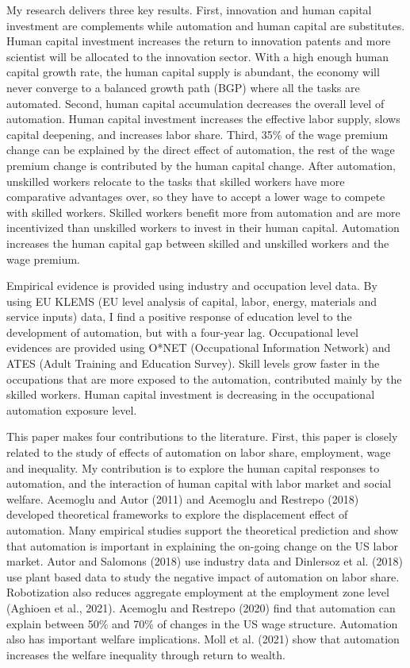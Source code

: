 \documentclass[12pt]{article}
\begin{document}
My research delivers three key results. First, innovation and human capital investment are complements while automation and human capital are substitutes. Human capital investment increases the return to innovation patents and more scientist will be allocated to the innovation sector. With a high enough human capital growth rate, the human capital supply is abundant, the economy will never converge to a balanced growth path (BGP) where all the tasks are automated. Second, human capital accumulation decreases the overall level of automation. Human capital investment increases the effective labor supply, slows capital deepening, and increases labor share. Third, 35\% of the wage premium change can be explained by the direct effect of automation, the rest of the wage premium change is contributed by the human capital change. After automation, unskilled workers relocate to the tasks that skilled workers have more comparative advantages over, so they have to accept a lower wage to compete with skilled workers. Skilled workers benefit more from automation and are more incentivized than unskilled workers to invest in their human capital. Automation increases the human capital gap between skilled and unskilled workers and the wage premium. 

Empirical evidence is provided using  industry and occupation level data. By using EU KLEMS (EU level analysis of capital, labor, energy, materials and service inputs) data, I find a positive response of education level to the development of automation, but with a four-year lag. Occupational level evidences are provided using O*NET (Occupational Information Network) and ATES (Adult Training and Education Survey). Skill levels grow faster in the occupations that are more exposed to the automation, contributed mainly by the skilled workers. Human capital investment is decreasing in the occupational automation exposure level. 

This paper makes four contributions to the literature. First, this paper is closely related to the study of effects of automation on labor share, employment, wage and inequality. My contribution is to explore the human capital responses to automation, and the interaction of human capital with labor market and social welfare. Acemoglu and Autor (2011)\nocite{AcemogluAutor2011} and Acemoglu and Restrepo (2018)\nocite{AcemogluRestrepo2018} developed theoretical frameworks to explore the displacement effect of automation. Many empirical studies support the theoretical prediction and show that automation is important in explaining the on-going change on the US labor market. Autor and Salomons (2018)\nocite{AutorSalomons2018} use industry data and Dinlersoz et al. (2018)\nocite{Dinlersozetal2018} use plant based data to study the negative impact of automation on labor share. Robotization also reduces aggregate employment at the employment zone level (Aghioen et al., 2021\nocite{Aghioenetal2021}). Acemoglu and Restrepo (2020)\nocite{AcemogluRestrepo2020} find that automation can explain between 50\% and 70\% of changes in the US wage structure. Automation also has important welfare implications. Moll et al. (2021)\nocite{Molletal2021} show that automation increases the welfare inequality through return to wealth. 
\end{document}

